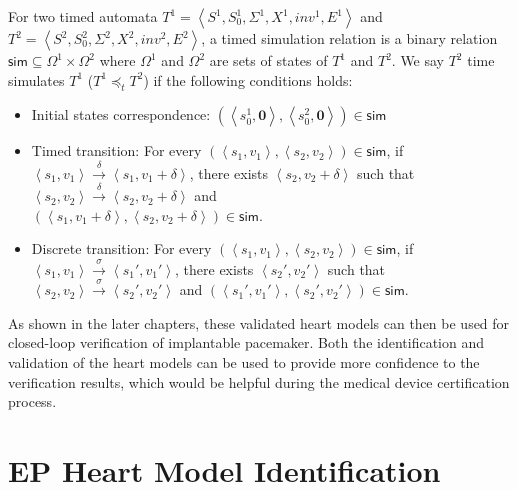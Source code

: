 For two timed automata $T^1=\left\langle S^1,S_0^1,\Sigma^1,X^1,inv^1,E^1\right\rangle$ and $T^2=\left\langle S^2,S_0^2,\Sigma^2,X^2,inv^2,E^2\right\rangle$, a timed simulation relation is a binary relation $\textsf{sim}\subseteq \Omega^1\times \Omega^2$ where $\Omega^1$ and $\Omega^2$ are sets of states of $T^1$ and $T^2$. We say $T^2$ \textsf{time simulates} $T^1$ ($T^1 \preceq_t T^2$) if the following conditions holds:
\begin{itemize}
	\item Initial states correspondence: $(\left\langle s_0^1,\textbf{0}\right\rangle,\left\langle s_0^2,\textbf{0}\right\rangle)\in \textsf{sim}$
	\item Timed transition: For every $(\left\langle s_1,v_1\right\rangle,\left\langle s_2,v_2\right\rangle)\in\textsf{sim}$, if $\left\langle s_1,v_1\right\rangle\xrightarrow{\delta}\left\langle s_1,v_1+\delta\right\rangle$, there exists $\left\langle s_2,v_2+\delta\right\rangle$ such that $\left\langle s_2,v_2\right\rangle\xrightarrow{\delta}\left\langle s_2,v_2+\delta\right\rangle$ and \\$(\left\langle s_1,v_1+\delta\right\rangle,\left\langle s_2,v_2+\delta\right\rangle)\in\textsf{sim}$.
	\item Discrete transition: For every $(\left\langle s_1,v_1\right\rangle,\left\langle s_2,v_2\right\rangle)\in\textsf{sim}$, if $\left\langle s_1,v_1\right\rangle\xrightarrow{\sigma}\left\langle s_1',v_1'\right\rangle$, there exists $\left\langle s_2',v_2'\right\rangle$ such that $\left\langle s_2,v_2\right\rangle\xrightarrow{\sigma}\left\langle s_2',v_2'\right\rangle$ and $(\left\langle s_1',v_1'\right\rangle,\left\langle s_2',v_2'\right\rangle)\in\textsf{sim}$.
\end{itemize}

As shown in the later chapters, these validated heart models can then be used for closed-loop verification of implantable pacemaker. Both the identification and validation of the heart models can be used to provide more confidence to the verification results, which would be helpful during the medical device certification process.



\section{EP Heart Model Identification}

